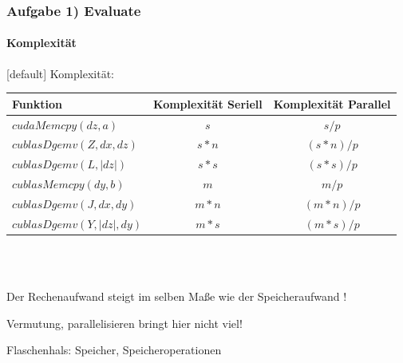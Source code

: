 \begin{frame}
	\frametitle{Aufgabe 1) Evaluate}
	\framesubtitle{Komplexität}
	[default]
	Komplexität:
	\begin{center}
	\begin{tabular}{ l | c | c}
		Funktion & Komplexität Seriell & Komplexität Parallel \\
		\hline
		$cudaMemcpy(dz,a)$	& $s$ & $s/p$  \\
		$cublasDgemv(Z,dx,dz)$& $s*n$ & $(s*n)/p$ \\
		$cublasDgemv(L, |dz|)$& $s*s$ & $(s*s)/p$ \\
		$cublasMemcpy(dy,b)$  & $m$  & $m/p$ \\
		$cublasDgemv(J,dx,dy)$& $m*n$ & $(m*n)/p$ \\
		$cublasDgemv(Y, |dz|, dy)$ & $m*s$ & $(m*s)/p$ \\
	\end{tabular} 	\\~\\
	\end{center}
	
	Der Rechenaufwand steigt im selben Maße wie der Speicheraufwand ! \\
	
	\begin{center}
		Vermutung, parallelisieren bringt hier nicht viel!
	\end{center}
	Flaschenhals: Speicher, Speicheroperationen
\end{frame}
\begin{frame}[plain]
\end{frame}
